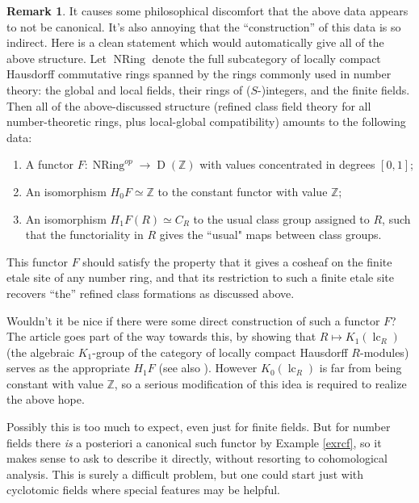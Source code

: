 \documentclass[12pt]{article}
\theoremstyle{definition}
\newtheorem{remark}[theorem]{Remark}
\newcommand{\on}{\operatorname}
\newcommand{\mbb}{\mathbb}
\begin{document}
\begin{remark}
It causes some philosophical discomfort that the above data appears to not be canonical.  It's also annoying that the ``construction'' of this data is so indirect.  Here is a clean statement which would automatically give all of the above structure.  Let $\on{NRing}$ denote the full subcategory of locally compact Hausdorff commutative rings spanned by the rings commonly used in number theory: the global and local fields, their rings of ($S$-)integers, and the finite fields.  Then all of the above-discussed structure (refined class field theory for all number-theoretic rings, plus local-global compatibility) amounts to the following data:
\begin{enumerate}
\item A functor $F:\on{NRing}^{op} \to \on{D}(\mbb{Z})$ with values concentrated in degrees $[0,1
]$;
\item An isomorphism $H_0F\simeq\mbb{Z}$ to the constant functor with value $\mbb{Z}$;
\item An isomorphism $H_1F(R)\simeq C_R$ to the usual class group assigned to $R$, such that the functoriality in $R$ gives the ``usual" maps between class groups.
\end{enumerate}
This functor $F$ should satisfy the property that it gives a cosheaf on the finite etale site of any number ring, and that its restriction to such a finite etale site recovers ``the'' refined class formations as discussed above.

Wouldn't it be nice if there were some direct construction of such a functor $F$?  The article \cite{clausenartin} goes part of the way towards this, by showing that $R\mapsto K_1(\on{lc}_R)$ (the algebraic $K_1$-group of the category of locally compact Hausdorff $R$-modules) serves as the appropriate $H_1F$ (see also \cite{braunling}).  However $K_0(\on{lc}_R)$ is far from being constant with value $\mbb{Z}$, so a serious modification of this idea is required to realize the above hope.

Possibly this is too much to expect, even just for finite fields.  But for number fields there \emph{is} a posteriori a canonical such functor by Example \ref{exrcf}, so it makes sense to ask to describe it directly, without resorting to cohomological analysis.  This is surely a difficult problem, but one could start just with cyclotomic fields where special features may be helpful.
\end{remark}
\end{document}
